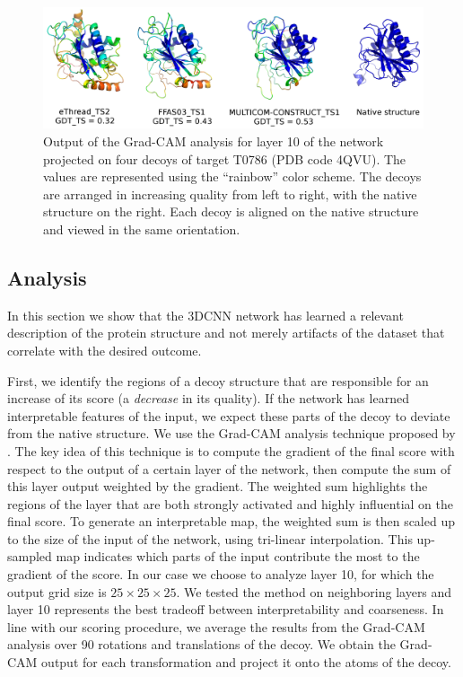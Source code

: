 \documentclass{bioinfo}
\begin{document}
\begin{figure}[!t]
    \centerline{\includegraphics[width=0.8\linewidth]{image7.png}}
    \vspace{-10pt}
    \caption{Output of the Grad-CAM analysis for layer 10 of the
      network projected on four decoys of target T0786 (PDB code
      4QVU).  The values are represented using the ``rainbow'' color
      scheme.  The decoys are arranged in increasing quality from left
      to right, with the native structure on the right.  Each decoy is
      aligned on the native structure and viewed in the same
      orientation.}
    \label{Fig:GradCAMT0786_more}
\end{figure}


\subsection{Analysis}

In this section we show that the 3DCNN network has learned a relevant
description of the protein structure and not merely artifacts of the
dataset that correlate with the desired outcome.

First, we identify the regions of a decoy structure that are
responsible for an increase of its score (a \emph{decrease} in its
quality). If the network has learned interpretable features of the
input, we expect these parts of the decoy to deviate from the native
structure.
%
We use the Grad-CAM analysis technique proposed by \citet{selvaraju2016grad}. 
The key idea of this technique is to
compute the gradient of the final score with respect to the output of
a certain layer of the network, then compute the sum of this layer
output weighted by the gradient.
%
The weighted sum highlights the regions of the layer that are both
strongly activated and highly influential on the final score. To
generate an interpretable map, the weighted sum is then scaled up to
the size of the input of the network, using tri-linear interpolation.
%
This up-sampled map indicates which parts of the input contribute
the most to the gradient of the score.  In our case we choose to
analyze layer 10, for which the output grid size is $25\times 25\times
25$.  We tested the method on neighboring layers and
layer 10 represents the best tradeoff between interpretability and
coarseness.
%
In line with our scoring procedure, we average the results
from the Grad-CAM analysis over 90 rotations and translations of the
decoy. We obtain the Grad-CAM output for each transformation and
project it onto the atoms of the decoy.  
\end{document}
